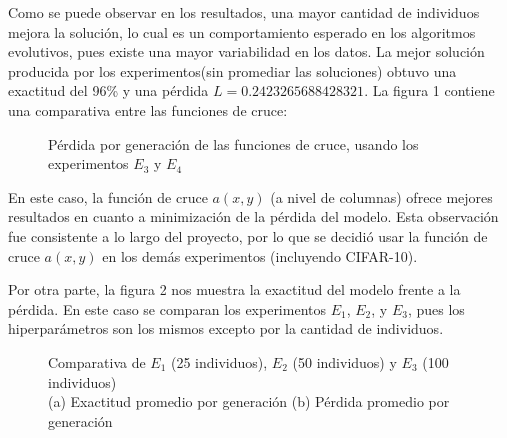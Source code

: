 \documentclass[conference]{IEEEtran}
\begin{document}
Como se puede observar en los resultados, una mayor cantidad de individuos mejora la solución, lo cual es un comportamiento esperado en los algoritmos evolutivos, pues existe una mayor variabilidad en los datos. La mejor solución producida por los experimentos(sin promediar las soluciones) obtuvo una exactitud del 96\% y una pérdida $L = 0.2423265688428321$. La figura 1 contiene una comparativa entre las funciones de cruce:

\begin{figure}[h]
  \begin{centering}
	\scalebox{0.7}{}
	\end{centering}
    \caption{Pérdida por generación de las funciones de cruce, usando los experimentos $E_3$ y $E_4$}
    \label{}
\end{figure}

En este caso, la función de cruce $a(x,y)$ (a nivel de columnas) ofrece mejores resultados en cuanto a minimización de la pérdida del modelo. Esta observación fue consistente a lo largo del proyecto, por lo que se decidió usar la función de cruce $a(x,y)$ en los demás experimentos (incluyendo CIFAR-10).

Por otra parte, la figura 2 nos muestra la exactitud del modelo frente a la pérdida. En este caso se comparan los experimentos $E_1$, $E_2$, y $E_3$, pues los hiperparámetros son los mismos excepto por la cantidad de individuos.  

\begin{figure}[h]
\begin{centering}
\begin{subfigure}{.25\textwidth}
   \begin{centering}
	\scalebox{0.35}{}
	\end{centering}
    \caption{}
    \label{}\end{subfigure}%
\begin{subfigure}{.25\textwidth}
  \begin{centering}
	\scalebox{0.35}{}
	\end{centering}
    \caption{}
    \label{}
\end{subfigure}
\end{centering}
\caption{Comparativa de $E_1$ (25 individuos), $E_2$ (50 individuos) y $E_3$ (100 individuos)\\(a) Exactitud promedio por generación (b) Pérdida promedio por generación}
\label{figure:comparision_fitness}
\end{figure}
\end{document}
